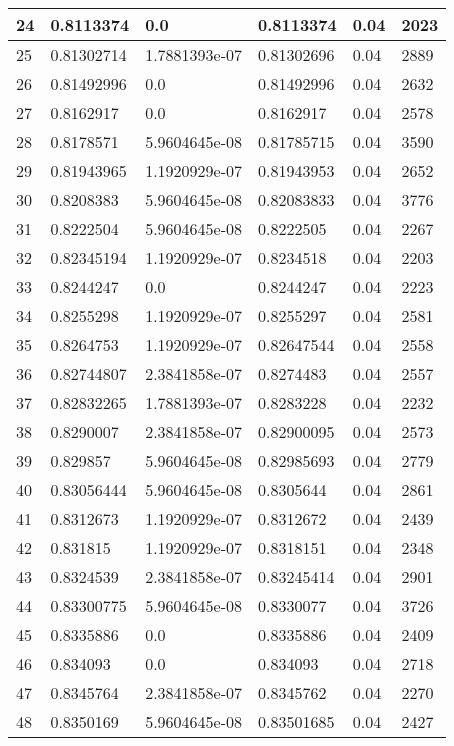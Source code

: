 \begin{longtable}{|l|l|l|l|l|l|}
24 & 0.8113374 & 0.0 & 0.8113374 & 0.04 & 2023 \\ \hline 
25 & 0.81302714 & 1.7881393e-07 & 0.81302696 & 0.04 & 2889 \\ \hline 
26 & 0.81492996 & 0.0 & 0.81492996 & 0.04 & 2632 \\ \hline 
27 & 0.8162917 & 0.0 & 0.8162917 & 0.04 & 2578 \\ \hline 
28 & 0.8178571 & 5.9604645e-08 & 0.81785715 & 0.04 & 3590 \\ \hline 
29 & 0.81943965 & 1.1920929e-07 & 0.81943953 & 0.04 & 2652 \\ \hline 
30 & 0.8208383 & 5.9604645e-08 & 0.82083833 & 0.04 & 3776 \\ \hline 
31 & 0.8222504 & 5.9604645e-08 & 0.8222505 & 0.04 & 2267 \\ \hline 
32 & 0.82345194 & 1.1920929e-07 & 0.8234518 & 0.04 & 2203 \\ \hline 
33 & 0.8244247 & 0.0 & 0.8244247 & 0.04 & 2223 \\ \hline 
34 & 0.8255298 & 1.1920929e-07 & 0.8255297 & 0.04 & 2581 \\ \hline 
35 & 0.8264753 & 1.1920929e-07 & 0.82647544 & 0.04 & 2558 \\ \hline 
36 & 0.82744807 & 2.3841858e-07 & 0.8274483 & 0.04 & 2557 \\ \hline 
37 & 0.82832265 & 1.7881393e-07 & 0.8283228 & 0.04 & 2232 \\ \hline 
38 & 0.8290007 & 2.3841858e-07 & 0.82900095 & 0.04 & 2573 \\ \hline 
39 & 0.829857 & 5.9604645e-08 & 0.82985693 & 0.04 & 2779 \\ \hline 
40 & 0.83056444 & 5.9604645e-08 & 0.8305644 & 0.04 & 2861 \\ \hline 
41 & 0.8312673 & 1.1920929e-07 & 0.8312672 & 0.04 & 2439 \\ \hline 
42 & 0.831815 & 1.1920929e-07 & 0.8318151 & 0.04 & 2348 \\ \hline 
43 & 0.8324539 & 2.3841858e-07 & 0.83245414 & 0.04 & 2901 \\ \hline 
44 & 0.83300775 & 5.9604645e-08 & 0.8330077 & 0.04 & 3726 \\ \hline 
45 & 0.8335886 & 0.0 & 0.8335886 & 0.04 & 2409 \\ \hline 
46 & 0.834093 & 0.0 & 0.834093 & 0.04 & 2718 \\ \hline 
47 & 0.8345764 & 2.3841858e-07 & 0.8345762 & 0.04 & 2270 \\ \hline 
48 & 0.8350169 & 5.9604645e-08 & 0.83501685 & 0.04 & 2427 \\ \hline 

\end{longtable}
